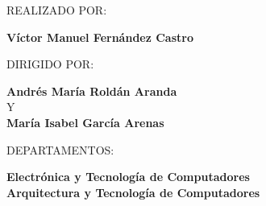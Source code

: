 \begin{center}
REALIZADO POR:
\par\end{center}

\begin{center}
\textbf{Víctor Manuel Fernández Castro}
\par\end{center}

\begin{center}
DIRIGIDO POR:
\par\end{center}

\begin{center}
\textbf{Andrés María Roldán Aranda} \\
Y \\
\textbf{María Isabel García Arenas}
\par\end{center}

\begin{center}
DEPARTAMENTOS:
\par\end{center}

\begin{center}
\textbf{Electrónica y Tecnología de Computadores} \\
\textbf{Arquitectura y Tecnología de Computadores}
\par\end{center}

\begin{center}
\vfill 
\par\end{center}



\vspace*{1.5cm}

\newpage
\thispagestyle{empty}

~

